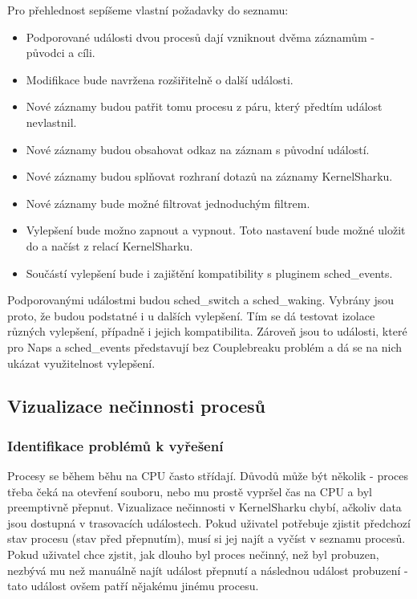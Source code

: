 Pro přehlednost sepíšeme vlastní požadavky do seznamu:
\begin{itemize}
    \item Podporované události dvou procesů dají vzniknout dvěma záznamům - původci a cíli.
    \item Modifikace bude navržena rozšiřitelně o další události.
    \item Nové záznamy budou patřit tomu procesu z páru, který předtím událost nevlastnil.
    \item Nové záznamy budou obsahovat odkaz na záznam s původní událostí.
    \item Nové záznamy budou splňovat rozhraní dotazů na záznamy KernelSharku.
    \item Nové záznamy bude možné filtrovat jednoduchým filtrem.
    \item Vylepšení bude možno zapnout a vypnout. Toto nastavení bude možné uložit do a načíst z relací KernelSharku.
    \item Součástí vylepšení bude i zajištění kompatibility s pluginem sched\_events.
\end{itemize}

Podporovanými událostmi budou sched\_switch a sched\_waking. Vybrány jsou proto, že budou podstatné i u dalších vylepšení. Tím se dá testovat izolace různých vylepšení, případně i jejich kompatibilita. Zároveň jsou to události, které pro Naps a sched\_events představují bez Couplebreaku problém a dá se na nich ukázat využitelnost vylepšení.

\subsection{Vizualizace nečinnosti procesů}

\subsubsection*{Identifikace problémů k vyřešení}
Procesy se během běhu na CPU často střídají. Důvodů může být několik - proces třeba čeká na otevření souboru, nebo mu prostě vypršel čas na CPU a byl preemptivně přepnut. Vizualizace nečinnosti v KernelSharku chybí, ačkoliv data jsou dostupná v trasovacích událostech. Pokud uživatel potřebuje zjistit předchozí stav procesu (stav před přepnutím), musí si jej najít a vyčíst v seznamu procesů. Pokud uživatel chce zjstit, jak dlouho byl proces nečinný, než byl probuzen, nezbývá mu než manuálně najít událost přepnutí a následnou událost probuzení - tato událost ovšem patří nějakému jinému procesu.

